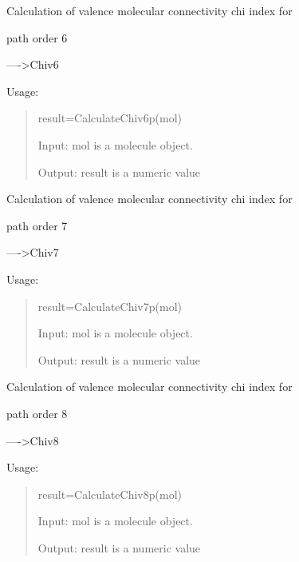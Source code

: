 \documentclass[letterpaper,10pt,english]{sphinxmanual}
\begin{document}

\begin{fulllineitems}
\label{reference/connectivity:connectivity.CalculateChiv6p}
Calculation of valence molecular connectivity chi index for

path order 6

----\textgreater{}Chiv6

Usage:
\begin{quote}

result=CalculateChiv6p(mol)

Input: mol is a molecule object.

Output: result is a numeric value
\end{quote}

\end{fulllineitems}


\begin{fulllineitems}
\label{reference/connectivity:connectivity.CalculateChiv7p}
Calculation of valence molecular connectivity chi index for

path order 7

----\textgreater{}Chiv7

Usage:
\begin{quote}

result=CalculateChiv7p(mol)

Input: mol is a molecule object.

Output: result is a numeric value
\end{quote}

\end{fulllineitems}


\begin{fulllineitems}
\label{reference/connectivity:connectivity.CalculateChiv8p}
Calculation of valence molecular connectivity chi index for

path order 8

----\textgreater{}Chiv8

Usage:
\begin{quote}

result=CalculateChiv8p(mol)

Input: mol is a molecule object.

Output: result is a numeric value
\end{quote}

\end{fulllineitems}
\end{document}
